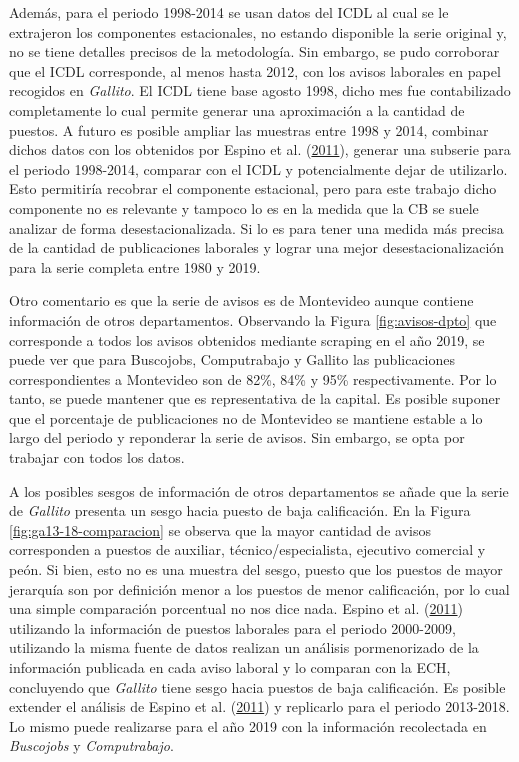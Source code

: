 \documentclass[12pt,oneside]{reedthesis}
\begin{document}
Además, para el periodo 1998-2014 se usan datos del ICDL al cual se le extrajeron los componentes estacionales, no estando disponible la serie original y, no se tiene detalles precisos de la metodología. Sin embargo, se pudo corroborar que el ICDL corresponde, al menos hasta 2012, con los avisos laborales en papel recogidos en \emph{Gallito}. El ICDL tiene base agosto 1998, dicho mes fue contabilizado completamente lo cual permite generar una aproximación a la cantidad de puestos. A futuro es posible ampliar las muestras entre 1998 y 2014, combinar dichos datos con los obtenidos por Espino et al. (\protect\hyperlink{ref-Alma2011}{2011}), generar una subserie para el periodo 1998-2014, comparar con el ICDL y potencialmente dejar de utilizarlo. Esto permitiría recobrar el componente estacional, pero para este trabajo dicho componente no es relevante y tampoco lo es en la medida que la CB se suele analizar de forma desestacionalizada. Si lo es para tener una medida más precisa de la cantidad de publicaciones laborales y lograr una mejor desestacionalización para la serie completa entre 1980 y 2019.

Otro comentario es que la serie de avisos es de Montevideo aunque contiene información de otros departamentos. Observando la Figura \ref{fig:avisos-dpto} que corresponde a todos los avisos obtenidos mediante scraping en el año 2019, se puede ver que para Buscojobs, Computrabajo y Gallito las publicaciones correspondientes a Montevideo son de 82\%, 84\% y 95\% respectivamente. Por lo tanto, se puede mantener que es representativa de la capital. Es posible suponer que el porcentaje de publicaciones no de Montevideo se mantiene estable a lo largo del periodo y reponderar la serie de avisos. Sin embargo, se opta por trabajar con todos los datos.

A los posibles sesgos de información de otros departamentos se añade que la serie de \emph{Gallito} presenta un sesgo hacia puesto de baja calificación. En la Figura \ref{fig:ga13-18-comparacion} se observa que la mayor cantidad de avisos corresponden a puestos de auxiliar, técnico/especialista, ejecutivo comercial y peón. Si bien, esto no es una muestra del sesgo, puesto que los puestos de mayor jerarquía son por definición menor a los puestos de menor calificación, por lo cual una simple comparación porcentual no nos dice nada. Espino et al. (\protect\hyperlink{ref-Alma2011}{2011}) utilizando la información de puestos laborales para el periodo 2000-2009, utilizando la misma fuente de datos realizan un análisis pormenorizado de la información publicada en cada aviso laboral y lo comparan con la ECH, concluyendo que \emph{Gallito} tiene sesgo hacia puestos de baja calificación. Es posible extender el análisis de Espino et al. (\protect\hyperlink{ref-Alma2011}{2011}) y replicarlo para el periodo 2013-2018. Lo mismo puede realizarse para el año 2019 con la información recolectada en \emph{Buscojobs} y \emph{Computrabajo}.
\end{document}

